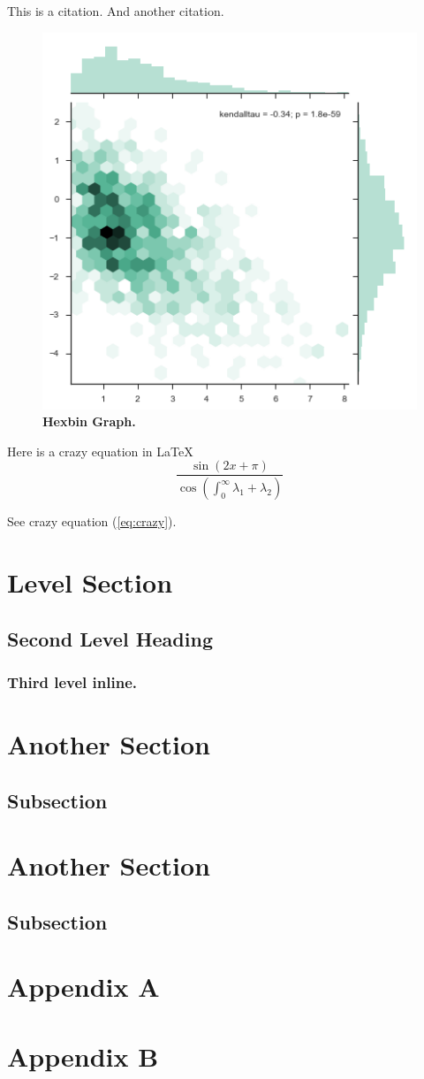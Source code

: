 \documentclass[12pt]{article}
\begin{document}
This is a citation\cite[chapter, p.~15]{greenwade93}.
And another citation\cite{goossens93}.

\begin{figure}[!ht]
	\includegraphics[width=0.4\linewidth]{hexbinmarginals}
	\caption[Figure \thefigure. Hexbin Marginal Graph]{ \textbf{Hexbin Graph.} }
	\label{fig:hexbin}
\end{figure}

Here is a crazy equation in \LaTeX
\begin{equation} \label{eq:crazy}
	\frac{\sin(2x + \pi)}{\cos(\int_0^\infty{\lambda_1 + \lambda_2})}
\end{equation}

See crazy equation (\ref{eq:crazy}).

\section{Level Section}
\blindtext
\blinditemize
\subsection{Second Level Heading}
\blindtext
\blindenumerate
\subsubsection{Third level inline.}
\blindtext
\section{Another Section}
\blindtext
\par
\blindtext
\subsection{Subsection}
\blindtext
\section{Another Section}
\blindtext
\par
\blindtext
\subsection{Subsection}
\blindtext

\section{Appendix A}
\blindtext
\blinditemize
\section{Appendix B}
\blindtext

\printbibliography
\end{document}
